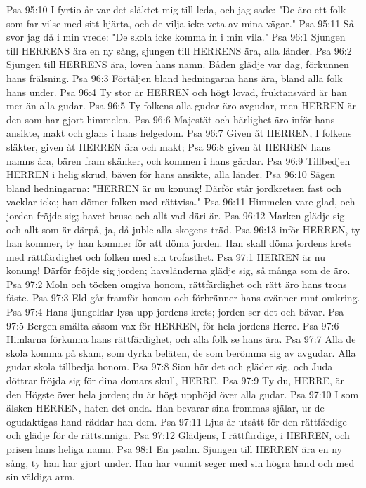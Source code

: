 Psa 95:10  I fyrtio år var det släktet mig till leda, och jag sade: "De äro ett folk som far vilse med sitt hjärta, och de vilja icke veta av mina vägar."
Psa 95:11  Så svor jag då i min vrede: "De skola icke komma in i min vila."
Psa 96:1  Sjungen till HERRENS ära en ny sång, sjungen till HERRENS ära, alla länder.
Psa 96:2  Sjungen till HERRENS ära, loven hans namn. Båden glädje var dag, förkunnen hans frälsning.
Psa 96:3  Förtäljen bland hedningarna hans ära, bland alla folk hans under.
Psa 96:4  Ty stor är HERREN och högt lovad, fruktansvärd är han mer än alla gudar.
Psa 96:5  Ty folkens alla gudar äro avgudar, men HERREN är den som har gjort himmelen.
Psa 96:6  Majestät och härlighet äro inför hans ansikte, makt och glans i hans helgedom.
Psa 96:7  Given åt HERREN, I folkens släkter, given åt HERREN ära och makt;
Psa 96:8  given åt HERREN hans namns ära, bären fram skänker, och kommen i hans gårdar.
Psa 96:9  Tillbedjen HERREN i helig skrud, bäven för hans ansikte, alla länder.
Psa 96:10  Sägen bland hedningarna: "HERREN är nu konung! Därför står jordkretsen fast och vacklar icke; han dömer folken med rättvisa."
Psa 96:11  Himmelen vare glad, och jorden fröjde sig; havet bruse och allt vad däri är.
Psa 96:12  Marken glädje sig och allt som är därpå, ja, då juble alla skogens träd.
Psa 96:13  inför HERREN, ty han kommer, ty han kommer för att döma jorden. Han skall döma jordens krets med rättfärdighet och folken med sin trofasthet.
Psa 97:1  HERREN är nu konung! Därför fröjde sig jorden; havsländerna glädje sig, så många som de äro.
Psa 97:2  Moln och töcken omgiva honom, rättfärdighet och rätt äro hans trons fäste.
Psa 97:3  Eld går framför honom och förbränner hans ovänner runt omkring.
Psa 97:4  Hans ljungeldar lysa upp jordens krets; jorden ser det och bävar.
Psa 97:5  Bergen smälta såsom vax för HERREN, för hela jordens Herre.
Psa 97:6  Himlarna förkunna hans rättfärdighet, och alla folk se hans ära.
Psa 97:7  Alla de skola komma på skam, som dyrka beläten, de som berömma sig av avgudar. Alla gudar skola tillbedja honom.
Psa 97:8  Sion hör det och gläder sig, och Juda döttrar fröjda sig för dina domars skull, HERRE.
Psa 97:9  Ty du, HERRE, är den Högste över hela jorden; du är högt upphöjd över alla gudar.
Psa 97:10  I som älsken HERREN, haten det onda. Han bevarar sina frommas själar, ur de ogudaktigas hand räddar han dem.
Psa 97:11  Ljus är utsått för den rättfärdige och glädje för de rättsinniga.
Psa 97:12  Glädjens, I rättfärdige, i HERREN, och prisen hans heliga namn.
Psa 98:1  En psalm. Sjungen till HERREN ära en ny sång, ty han har gjort under. Han har vunnit seger med sin högra hand och med sin väldiga arm.
